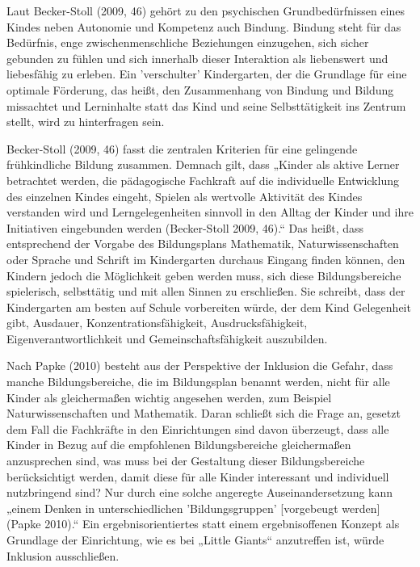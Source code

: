 Laut Becker-Stoll (2009, 46) gehört zu den psychischen Grundbedürfnissen eines Kindes neben Autonomie und Kompetenz auch Bindung. Bindung steht für das Bedürfnis, enge zwischenmenschliche Beziehungen einzugehen, sich sicher gebunden zu fühlen und sich innerhalb dieser Interaktion als liebenswert und liebesfähig zu erleben. Ein 'verschulter' Kindergarten, der die Grundlage für eine optimale Förderung, das heißt, den Zusammenhang von Bindung und Bildung  missachtet und Lerninhalte statt das Kind und seine Selbsttätigkeit ins Zentrum stellt, wird zu hinterfragen sein.
 
Becker-Stoll (2009, 46) fasst die zentralen Kriterien für eine gelingende frühkindliche Bildung zusammen. Demnach gilt, dass 
„Kinder als aktive Lerner betrachtet werden,
die pädagogische Fachkraft auf die individuelle Entwicklung des einzelnen Kindes eingeht,
Spielen als wertvolle Aktivität des Kindes verstanden wird und 
Lerngelegenheiten sinnvoll in den Alltag der Kinder und ihre Initiativen eingebunden werden (Becker-Stoll 2009, 46).“
Das heißt, dass entsprechend der Vorgabe des Bildungsplans Mathematik, Naturwissenschaften oder Sprache und Schrift im Kindergarten durchaus Eingang finden können, den Kindern jedoch die Möglichkeit geben werden muss, sich diese Bildungsbereiche spielerisch, selbsttätig und mit allen Sinnen zu erschließen. Sie schreibt, dass der Kindergarten am besten auf Schule vorbereiten würde, der dem Kind Gelegenheit gibt, Ausdauer, Konzentrationsfähigkeit, Ausdrucksfähigkeit, Eigenverantwortlichkeit und Gemeinschaftsfähigkeit auszubilden.

Nach Papke (2010) besteht aus der Perspektive der Inklusion die Gefahr, dass manche Bildungsbereiche, die im Bildungsplan benannt werden, nicht für alle Kinder als gleichermaßen wichtig angesehen werden, zum Beispiel Naturwissenschaften und Mathematik. Daran schließt sich die Frage an, gesetzt dem Fall die Fachkräfte in den Einrichtungen sind davon überzeugt, dass alle Kinder in Bezug auf die empfohlenen Bildungsbereiche gleichermaßen anzusprechen sind, was muss bei der Gestaltung dieser Bildungsbereiche berücksichtigt werden, damit diese für alle Kinder interessant und individuell nutzbringend sind? Nur durch eine solche angeregte Auseinandersetzung kann „einem Denken in unterschiedlichen 'Bildungsgruppen' [vorgebeugt werden] (Papke 2010).“ 
Ein ergebnisorientiertes statt einem ergebnisoffenen Konzept als Grundlage der Einrichtung, wie es bei „Little Giants“ anzutreffen ist, würde Inklusion ausschließen. 
 
